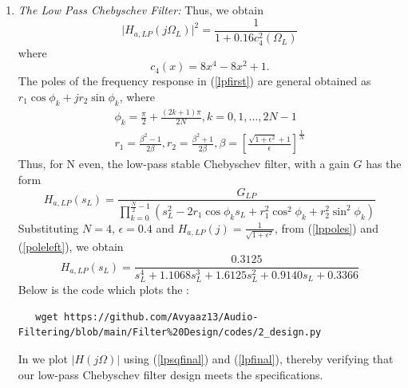 \documentclass[article]{IEEEtran}
\theoremstyle{remark}
\numberwithin{equation}{subsection}
\begin{document}
\begin{enumerate}
\item {\em The Low Pass Chebyschev Filter:} Thus, we obtain
\begin{equation}
\label{lpsqfinal}
\vert H_{a,LP}(j\Omega_L)\vert^2 = \frac{1}{1 + 0.16c_4^2(\Omega_L)}
\end{equation}
where
\begin{equation}
c_4(x) = 8x^4 - 8x^2 + 1.	
\end{equation}
The poles of the frequency response in (\ref{lpfirst}) are general obtained as 
$r_1\cos\phi_k + jr_2\sin \phi_k$, where
\begin{eqnarray}
\label{lppoles}
\phi_k = \frac{\pi}{2} + \frac{(2k+1)\pi}{2N}, k = 0, 1, \dots, 2N-1 \nonumber \\
r_1 = \frac{\beta^2 - 1}{2\beta}, r_2 = \frac{\beta^2 + 1}{2\beta}, \beta = \left[ \frac{\sqrt{1 + \epsilon^2} + 1}{\epsilon}\right]^{\frac{1}{N}}
\end{eqnarray}
Thus, for N even, the low-pass stable Chebyschev filter, with a gain $G$ has the form
\begin{equation}
\label{poleleft}
H_{a,LP}(s_L) = \frac{G_{LP}}{\prod_{k = 0}^{\frac{N}{2}-1}(s_L^2 - 2r_1\cos\phi_ks_L + r_1^2\cos^2\phi_k + r_2^2 \sin^2\phi_k)}
\end{equation}
Substituting $N = 4$, $\epsilon = 0.4$ and $H_{a,LP}(j) = \frac{1}{\sqrt{1+\epsilon^2}}$, from (\ref{lppoles}) and (\ref{poleleft}), we obtain 
\begin{equation}
\label{lpfinal}
H_{a,LP}(s_L) = \frac{0.3125}{s_L^4 + 1.1068s_L^3 + 1.6125s_L^2+0.9140s_L + 0.3366}
\end{equation}
Below is the code which plots the :
\begin{lstlisting}
   wget https://github.com/Avyaaz13/Audio-Filtering/blob/main/Filter%20Design/codes/2_design.py
\end{lstlisting}
In  we plot $|H(j\Omega)|$ using (\ref{lpsqfinal}) and (\ref{lpfinal}), thereby verifying that our low-pass Chebyschev filter design meets the specifications.


\end{enumerate}
\end{document}
